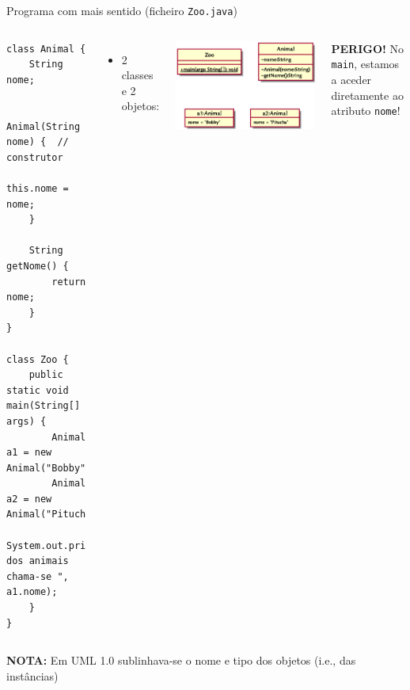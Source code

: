 \documentclass[portuguese, aspectratio=169, xcolor=table]{beamer}
\begin{document}
\begin{frame}[fragile]{Programa com mais sentido (ficheiro \texttt{Zoo.java})}
\begin{columns}
\begin{verbatim}
class Animal {
    String nome;

    Animal(String nome) {  // construtor
        this.nome = nome;
    }

    String getNome() {
        return nome;
    }
}

class Zoo {
    public static void main(String[] args) {
        Animal a1 = new Animal("Bobby");
        Animal a2 = new Animal("Pitucha");
        System.out.println("Um dos animais chama-se ", a1.nome);
    }
}
\end{verbatim}
\begin{itemize}
    \item 2 classes e 2 objetos:
\end{itemize}
    \begin{center}
        \includegraphics[width=0.6\linewidth]{./uml_diagrams/class3}
    \end{center}
\textbf{\color{red}PERIGO!} No \texttt{main}, estamos a aceder diretamente ao atributo \texttt{nome}!
\end{columns}
\vspace{-0.2cm}
\begin{flushright}
\tiny    \textbf{NOTA:} Em UML 1.0 sublinhava-se o nome e tipo dos objetos (i.e., das instâncias)
\end{flushright}
\end{frame}
\end{document}
